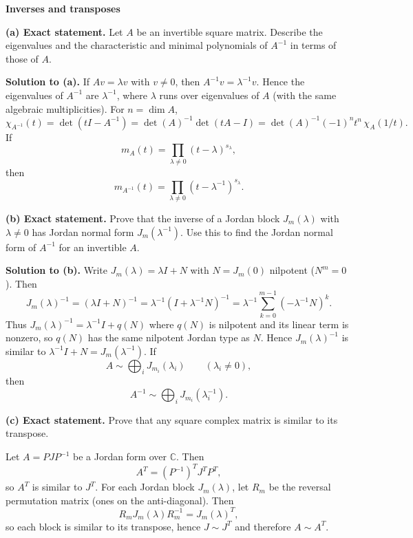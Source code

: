 \begin{problem}[CP-I-0053]
\label{prob:cp-i-0053}
\textbf{Inverses and transposes}

\hspace*{1.5em}\textbf{(a) Exact statement.}
Let $A$ be an invertible square matrix. Describe the eigenvalues and the characteristic and minimal polynomials of $A^{-1}$ in terms of those of $A$.

\textbf{Solution to (a).}
If $Av=\lambda v$ with $v\neq 0$, then $A^{-1}v=\lambda^{-1}v$. Hence the eigenvalues of $A^{-1}$ are $\lambda^{-1}$, where $\lambda$ runs over eigenvalues of $A$ (with the same algebraic multiplicities).
For $n=\dim A$,
\[
\chi_{A^{-1}}(t)=\det(tI-A^{-1})
=\det(A)^{-1}\det(tA-I)
=\det(A)^{-1}(-1)^n t^n\,\chi_A(1/t).
\]
If
\[
m_A(t)=\prod_{\lambda\neq 0}(t-\lambda)^{s_\lambda},
\]
then
\[
m_{A^{-1}}(t)=\prod_{\lambda\neq 0}(t-\lambda^{-1})^{s_\lambda}.
\]

\medskip
\textbf{(b) Exact statement.}
Prove that the inverse of a Jordan block $J_m(\lambda)$ with $\lambda\neq 0$ has Jordan normal form $J_m(\lambda^{-1})$.
Use this to find the Jordan normal form of $A^{-1}$ for an invertible $A$.

\textbf{Solution to (b).}
Write $J_m(\lambda)=\lambda I+N$ with $N=J_m(0)$ nilpotent ($N^m=0$). Then
\[
J_m(\lambda)^{-1}
=(\lambda I+N)^{-1}
=\lambda^{-1}(I+\lambda^{-1}N)^{-1}
=\lambda^{-1}\sum_{k=0}^{m-1}(-\lambda^{-1}N)^k.
\]
Thus $J_m(\lambda)^{-1}=\lambda^{-1}I+q(N)$ where $q(N)$ is nilpotent and its linear term is nonzero, so $q(N)$ has the same nilpotent Jordan type as $N$.
Hence $J_m(\lambda)^{-1}$ is similar to $\lambda^{-1}I+N=J_m(\lambda^{-1})$.
If
\[
A\sim \bigoplus_i J_{m_i}(\lambda_i)\qquad(\lambda_i\neq 0),
\]
then
\[
A^{-1}\sim \bigoplus_i J_{m_i}(\lambda_i^{-1}).
\]

\medskip
\textbf{(c) Exact statement.}
Prove that any square complex matrix is similar to its transpose.

\end{problem}

\begin{solution}
Let $A=PJP^{-1}$ be a Jordan form over $\mathbb C$. Then
\[
A^T=(P^{-1})^T J^T P^T,
\]
so $A^T$ is similar to $J^T$. For each Jordan block $J_m(\lambda)$, let $R_m$ be the reversal permutation matrix (ones on the anti-diagonal). Then
\[
R_m J_m(\lambda) R_m^{-1}=J_m(\lambda)^T,
\]
so each block is similar to its transpose, hence $J\sim J^T$ and therefore $A\sim A^T$.
\end{solution}

